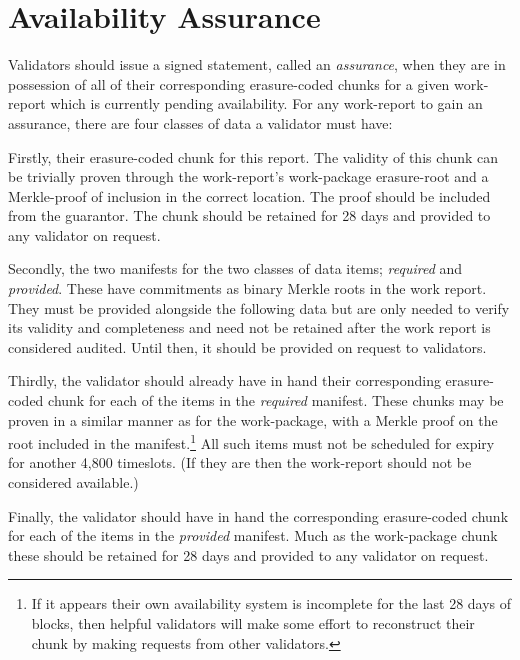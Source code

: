 \section{Availability Assurance}\label{sec:assurance}

Validators should issue a signed statement, called an \emph{assurance}, when they are in possession of all of their corresponding erasure-coded chunks for a given work-report which is currently pending availability. For any work-report to gain an assurance, there are four classes of data a validator must have:

Firstly, their erasure-coded chunk for this report. The validity of this chunk can be trivially proven through the work-report's work-package erasure-root and a Merkle-proof of inclusion in the correct location. The proof should be included from the guarantor. The chunk should be retained for 28 days and provided to any validator on request.

Secondly, the two manifests for the two classes of data items; \emph{required} and \emph{provided}. These have commitments as binary Merkle roots in the work report. They must be provided alongside the following data but are only needed to verify its validity and completeness and need not be retained after the work report is considered audited. Until then, it should be provided on request to validators.

Thirdly, the validator should already have in hand their corresponding erasure-coded chunk for each of the items in the \emph{required} manifest. These chunks may be proven in a similar manner as for the work-package, with a Merkle proof on the root included in the manifest.\footnote{If it appears their own availability system is incomplete for the last 28 days of blocks, then helpful validators will make some effort to reconstruct their chunk by making requests from other validators.} All such items must not be scheduled for expiry for another 4,800 timeslots. (If they are then the work-report should not be considered available.)

Finally, the validator should have in hand the corresponding erasure-coded chunk for each of the items in the \emph{provided} manifest. Much as the work-package chunk these should be retained for 28 days and provided to any validator on request.

